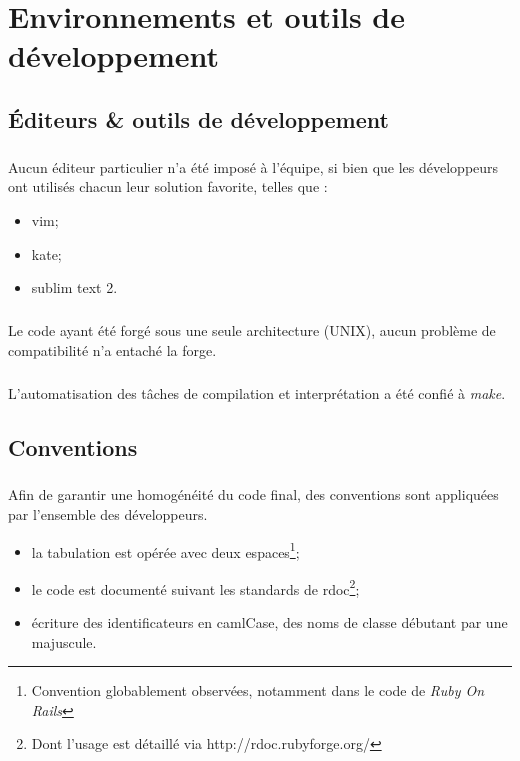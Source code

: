 \chapter{Environnements et outils de développement} 


\section{Éditeurs \& outils de développement}
        \paragraph*{}
        Aucun éditeur particulier n'a été imposé à l'équipe, si bien que les  développeurs ont utilisés chacun leur solution favorite, telles que :
	\begin{itemize}
		\item vim;
		\item kate;
		\item sublim text 2.
	\end{itemize}
	\paragraph*{}
	Le code ayant été forgé sous une seule architecture (UNIX), aucun problème de compatibilité n'a entaché la forge.
	\paragraph*{}
	L'automatisation des tâches de compilation et interprétation a été confié à \textit{make}.


\section{Conventions}
        \paragraph*{}
        Afin de garantir une homogénéité du code final, des conventions sont appliquées par l'ensemble des développeurs.
	\begin{itemize}
		\item  la tabulation est opérée avec deux espaces\footnote{Convention  globablement observées, notamment dans le code de \textit{Ruby On  Rails}};
		\item le code est documenté suivant les standards de rdoc\footnote{Dont l'usage est détaillé via http://rdoc.rubyforge.org/};
		\item écriture des identificateurs en camlCase, des noms de classe débutant par une majuscule.
	\end{itemize}


